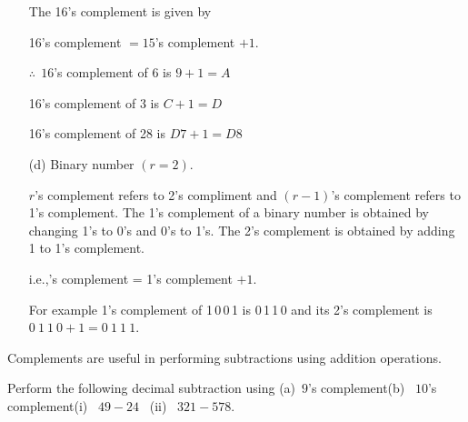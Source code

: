 \begin{solution}
\begin{itemize}
The 16's complement is given by

16's complement $=15$'s complement $+1$.

$\therefore~~ 16$'s complement of 6 is $9+1=A$

16's complement of 3 is $C+1=D$

16's complement of 28 is $D7+1=D8$

\item[(d)] Binary number $(r=2)$.

$r$'s complement refers to 2's compliment and $(r-1)$'s complement refers to 1's complement. The 1's complement of a binary number is obtained by changing 1's to 0's and 0's to 1's. The 2's complement is obtained by adding 1 to 1's complement.

i.e.,'s complement = 1's complement $+1$.

For example 1's complement of 1\,0\,0\,1 is 0\,1\,1\,0 and its 2's complement is $0~1~1~0+1=0~1~1~1$. 

\end{itemize}
Complements are useful in performing subtractions using addition operations.
\end{solution}

\begin{example}\label{exam6.18}
Perform the following decimal subtraction using (a)~$9$'s complement\break (b)~ $10$'s complement\quad (i)~ $49-24$~ (ii)~ $321-578$.
\end{example}

